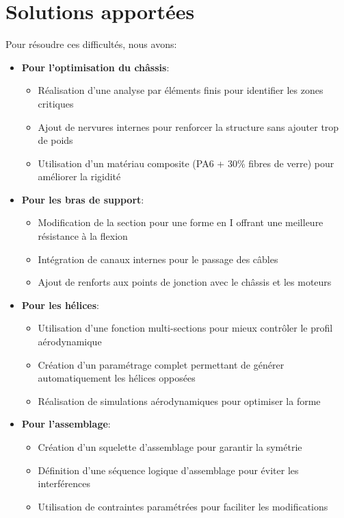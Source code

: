 \documentclass[a4paper,12pt]{report}
\begin{document}
\section{Solutions apportées}
Pour résoudre ces difficultés, nous avons:

\begin{itemize}
    \item \textbf{Pour l'optimisation du châssis}:
    \begin{itemize}
        \item Réalisation d'une analyse par éléments finis pour identifier les zones critiques
        \item Ajout de nervures internes pour renforcer la structure sans ajouter trop de poids
        \item Utilisation d'un matériau composite (PA6 + 30\% fibres de verre) pour améliorer la rigidité
    \end{itemize}
    
    \item \textbf{Pour les bras de support}:
    \begin{itemize}
        \item Modification de la section pour une forme en I offrant une meilleure résistance à la flexion
        \item Intégration de canaux internes pour le passage des câbles
        \item Ajout de renforts aux points de jonction avec le châssis et les moteurs
    \end{itemize}
    
    \item \textbf{Pour les hélices}:
    \begin{itemize}
        \item Utilisation d'une fonction multi-sections pour mieux contrôler le profil aérodynamique
        \item Création d'un paramétrage complet permettant de générer automatiquement les hélices opposées
        \item Réalisation de simulations aérodynamiques pour optimiser la forme
    \end{itemize}
    
    \item \textbf{Pour l'assemblage}:
    \begin{itemize}
        \item Création d'un squelette d'assemblage pour garantir la symétrie
        \item Définition d'une séquence logique d'assemblage pour éviter les interférences
        \item Utilisation de contraintes paramétrées pour faciliter les modifications
    \end{itemize}
\end{itemize}
\end{document}
